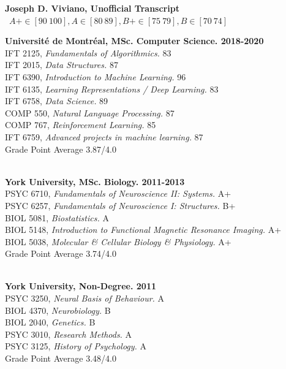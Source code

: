 \documentclass[10pt,oneside,a4paper]{report}
\begin{document}
\begin{center}
\textbf{Joseph D. Viviano, Unofficial Transcript} \\\
$A+ \in [90 \ 100], A \in [80 \ 89], B+ \in [75 \ 79], B \in [70 \ 74]$
\end{center}

\begin{flushleft}
\textbf{Universit\'e de Montr\'eal, MSc. Computer Science. \hfill 2018-2020} \\

IFT 2125, \textit{Fundamentals of Algorithmics.}  \hfill 83 \\
IFT 2015, \textit{Data Structures.} \hfill 87 \\
IFT 6390, \textit{Introduction to Machine Learning.} \hfill 96 \\
IFT 6135, \textit{Learning Representations / Deep Learning.} \hfill 83 \\
IFT 6758, \textit{Data Science.} \hfill 89 \\
COMP 550, \textit{Natural Language Processing.} \hfill 87 \\
COMP 767, \textit{Reinforcement Learning.} \hfill 85 \\
IFT 6759, \textit{Advanced projects in machine learning.} \hfill 87 \\
Grade Point Average \hfill 3.87/4.0 \\\

\textbf{York University, MSc. Biology. \hfill 2011-2013} \\

PSYC 6710, \textit{Fundamentals of Neuroscience II: Systems.}  \hfill A+ \\
PSYC 6257, \textit{Fundamentals of Neuroscience I: Structures.} \hfill B+ \\
BIOL 5081, \textit{Biostatistics.} \hfill A \\
BIOL 5148, \textit{Introduction to Functional Magnetic Resonance Imaging.} \hfill A+ \\
BIOL 5038, \textit{Molecular \& Cellular Biology \& Physiology.} \hfill A+ \\
Grade Point Average \hfill 3.74/4.0 \\\

\textbf{York University, Non-Degree. \hfill 2011} \\

PSYC 3250, \textit{Neural Basis of Behaviour.} \hfill A \\
BIOL 4370, \textit{Neurobiology.} \hfill B \\
BIOL 2040, \textit{Genetics.} \hfill B \\
PSYC 3010, \textit{Research Methods.} \hfill A \\
PSYC 3125, \textit{History of Psychology.} \hfill A \\
Grade Point Average \hfill 3.48/4.0 \\\


\end{flushleft}
\end{document}
